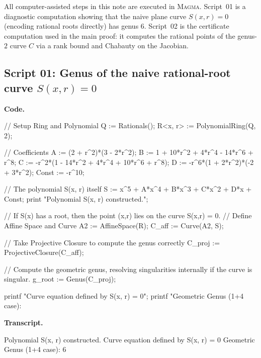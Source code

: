 \documentclass[12pt]{article}
\theoremstyle{remark}
\theoremstyle{definition}
\begin{document}
\noindent
All computer-assisted steps in this note are executed in \textsc{Magma}.
Script~01 is a diagnostic computation showing that the naive plane curve $S(x,r)=0$ (encoding rational roots directly) has genus $6$.
Script~02 is the certificate computation used in the main proof: it computes the rational points of the genus-$2$ curve $C$ via a rank bound and Chabauty on the Jacobian.

\subsection*{Script 01: Genus of the naive rational-root curve $S(x,r)=0$}
\noindent\textbf{Code.}
\begin{code}
// Setup Ring and Polynomial
Q := Rationals();
R<x, r> := PolynomialRing(Q, 2);

// Coefficients
A := (2 + r^2)*(3 - 2*r^2);
B := 1 + 10*r^2 + 4*r^4 - 14*r^6 + r^8;
C := -r^2*(1 - 14*r^2 + 4*r^4 + 10*r^6 + r^8);
D := -r^6*(1 + 2*r^2)*(-2 + 3*r^2);
Const := -r^10;

// The polynomial S(x, r) itself
S := x^5 + A*x^4 + B*x^3 + C*x^2 + D*x + Const;
print "Polynomial S(x, r) constructed.";

// If S(x) has a root, then the point (x,r) lies on the curve S(x,r) = 0.
// Define Affine Space and Curve
A2 := AffineSpace(R);
C_aff := Curve(A2, S);

// Take Projective Closure to compute the genus correctly
C_proj := ProjectiveClosure(C_aff);

// Compute the geometric genus, resolving singularities internally if the curve is singular.
g_root := Genus(C_proj);

printf "Curve equation defined by S(x, r) = 0\n";
printf "Geometric Genus (1+4 case): %
\end{code}

\noindent\textbf{Transcript.}
\begin{term}
Polynomial S(x, r) constructed.
Curve equation defined by S(x, r) = 0
Geometric Genus (1+4 case): 6
\end{term}
\end{document}
